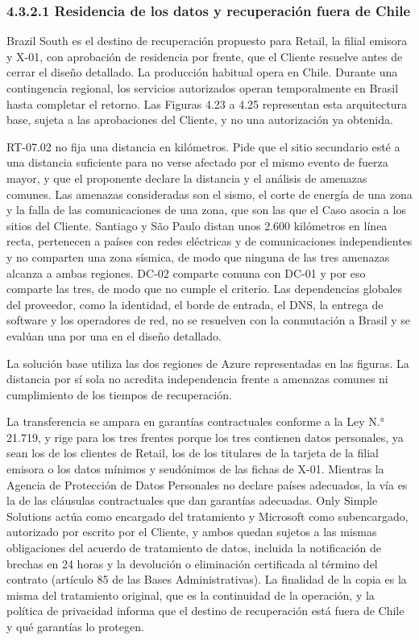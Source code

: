 \documentclass[11pt]{article}
\begin{document}
\subsubsection{4.3.2.1 Residencia de los datos y recuperación fuera de Chile}

Brazil South es el destino de recuperación propuesto para Retail, la filial emisora y X-01, con aprobación de residencia por frente, que el Cliente resuelve antes de cerrar el diseño detallado. La producción habitual opera en Chile. Durante una contingencia regional, los servicios autorizados operan temporalmente en Brasil hasta completar el retorno. Las Figuras 4.23 a 4.25 representan esta arquitectura base, sujeta a las aprobaciones del Cliente, y no una autorización ya obtenida.

RT-07.02 no fija una distancia en kilómetros. Pide que el sitio secundario esté a una distancia suficiente para no verse afectado por el mismo evento de fuerza mayor, y que el proponente declare la distancia y el análisis de amenazas comunes. Las amenazas consideradas son el sismo, el corte de energía de una zona y la falla de las comunicaciones de una zona, que son las que el Caso asocia a los sitios del Cliente. Santiago y São Paulo distan unos 2.600 kilómetros en línea recta, pertenecen a países con redes eléctricas y de comunicaciones independientes y no comparten una zona sísmica, de modo que ninguna de las tres amenazas alcanza a ambas regiones. DC-02 comparte comuna con DC-01 y por eso comparte las tres, de modo que no cumple el criterio. Las dependencias globales del proveedor, como la identidad, el borde de entrada, el DNS, la entrega de software y los operadores de red, no se resuelven con la conmutación a Brasil y se evalúan una por una en el diseño detallado.

La solución base utiliza las dos regiones de Azure representadas en las figuras. La distancia por sí sola no acredita independencia frente a amenazas comunes ni cumplimiento de los tiempos de recuperación.

La transferencia se ampara en garantías contractuales conforme a la Ley N.° 21.719, y rige para los tres frentes porque los tres contienen datos personales, ya sean los de los clientes de Retail, los de los titulares de la tarjeta de la filial emisora o los datos mínimos y seudónimos de las fichas de X-01. Mientras la Agencia de Protección de Datos Personales no declare países adecuados, la vía es la de las cláusulas contractuales que dan garantías adecuadas. Only Simple Solutions actúa como encargado del tratamiento y Microsoft como subencargado, autorizado por escrito por el Cliente, y ambos quedan sujetos a las mismas obligaciones del acuerdo de tratamiento de datos, incluida la notificación de brechas en 24 horas y la devolución o eliminación certificada al término del contrato (artículo 85 de las Bases Administrativas). La finalidad de la copia es la misma del tratamiento original, que es la continuidad de la operación, y la política de privacidad informa que el destino de recuperación está fuera de Chile y qué garantías lo protegen.
\end{document}
